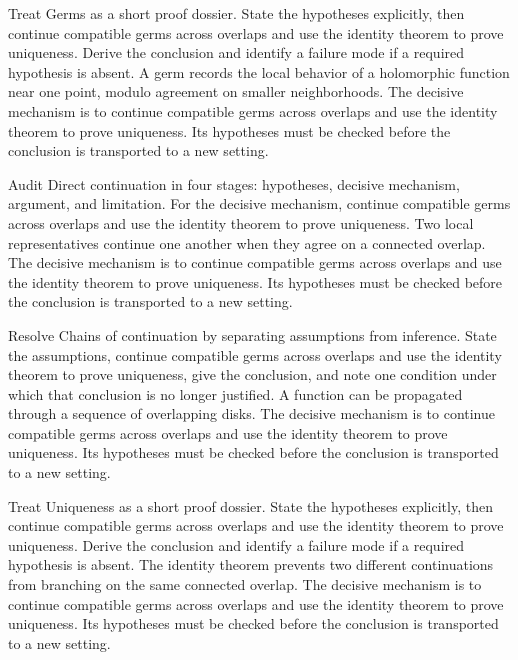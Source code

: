 \begin{example}\label{ex:iv15-worked-01}
Treat Germs as a short proof dossier. State the hypotheses explicitly, then continue compatible germs across overlaps and use the identity theorem to prove uniqueness. Derive the conclusion and identify a failure mode if a required hypothesis is absent. A germ records the local behavior of a holomorphic function near one point, modulo agreement on smaller neighborhoods. The decisive mechanism is to continue compatible germs across overlaps and use the identity theorem to prove uniqueness. Its hypotheses must be checked before the conclusion is transported to a new setting.
\end{example}

\begin{example}\label{ex:iv15-worked-02}
Audit Direct continuation in four stages: hypotheses, decisive mechanism, argument, and limitation. For the decisive mechanism, continue compatible germs across overlaps and use the identity theorem to prove uniqueness. Two local representatives continue one another when they agree on a connected overlap. The decisive mechanism is to continue compatible germs across overlaps and use the identity theorem to prove uniqueness. Its hypotheses must be checked before the conclusion is transported to a new setting.
\end{example}

\begin{example}\label{ex:iv15-worked-03}
Resolve Chains of continuation by separating assumptions from inference. State the assumptions, continue compatible germs across overlaps and use the identity theorem to prove uniqueness, give the conclusion, and note one condition under which that conclusion is no longer justified. A function can be propagated through a sequence of overlapping disks. The decisive mechanism is to continue compatible germs across overlaps and use the identity theorem to prove uniqueness. Its hypotheses must be checked before the conclusion is transported to a new setting.
\end{example}

\begin{example}\label{ex:iv15-worked-04}
Treat Uniqueness as a short proof dossier. State the hypotheses explicitly, then continue compatible germs across overlaps and use the identity theorem to prove uniqueness. Derive the conclusion and identify a failure mode if a required hypothesis is absent. The identity theorem prevents two different continuations from branching on the same connected overlap. The decisive mechanism is to continue compatible germs across overlaps and use the identity theorem to prove uniqueness. Its hypotheses must be checked before the conclusion is transported to a new setting.
\end{example}

